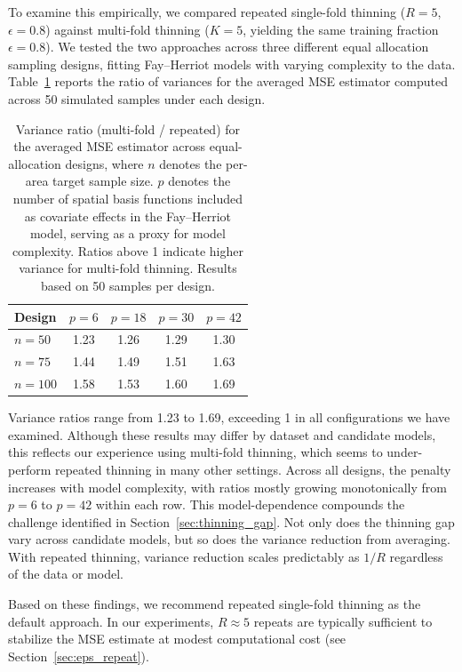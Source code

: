 \documentclass[11pt]{article}
\theoremstyle{plain}
\theoremstyle{definition}
\theoremstyle{remark}
\begin{document}
To examine this empirically, we compared repeated single-fold thinning ($R=5$, $\epsilon=0.8$) against multi-fold thinning ($K=5$, yielding the same training fraction $\epsilon = 0.8$). We tested the two approaches across three different equal allocation sampling designs, fitting Fay--Herriot models with varying complexity to the data. Table~\ref{tab:multifold} reports the ratio of variances for the averaged MSE estimator computed across 50 simulated samples under each design.

\begin{table}[ht]
\centering
\begin{tabular}{lcccc}
  \toprule
Design & $p=6$ & $p=18$ & $p=30$ & $p=42$ \\
  \midrule
$n=50$ & 1.23 & 1.26 & 1.29 & 1.30 \\
  $n=75$ & 1.44 & 1.49 & 1.51 & 1.63 \\
  $n=100$ & 1.58 & 1.53 & 1.60 & 1.69 \\
   \bottomrule
\end{tabular}
\caption{Variance ratio (multi-fold / repeated) for the averaged MSE estimator across equal-allocation designs, where $n$ denotes the per-area target sample size. $p$ denotes the number of spatial basis functions included as covariate effects in the Fay--Herriot model, serving as a proxy for model complexity. Ratios above 1 indicate higher variance for multi-fold thinning. Results based on 50 samples per design.}
\label{tab:multifold}
\end{table}

Variance ratios range from 1.23 to 1.69, exceeding 1 in all configurations we have examined. Although these results may differ by dataset and candidate models, this reflects our experience using multi-fold thinning, which seems to under-perform repeated thinning in many other settings. Across all designs, the penalty increases with model complexity, with ratios mostly growing monotonically from $p=6$ to $p=42$ within each row. This model-dependence compounds the challenge identified in Section~\ref{sec:thinning_gap}. Not only does the thinning gap vary across candidate models, but so does the variance reduction from averaging. With repeated thinning, variance reduction scales predictably as $1/R$ regardless of the data or model.

Based on these findings, we recommend repeated single-fold thinning as the default approach. In our experiments, $R \approx 5$ repeats are typically sufficient to stabilize the MSE estimate at modest computational cost (see Section~\ref{sec:eps_repeat}).
\end{document}
